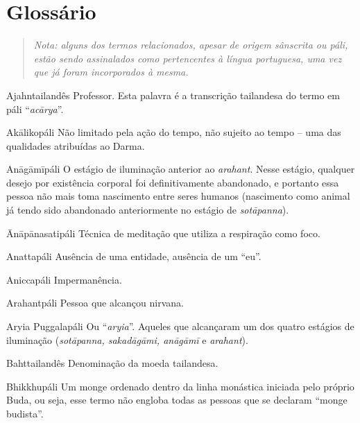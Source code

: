 
\chapter{Glossário}

\begin{quote}
\itshape Nota: alguns dos termos relacionados, apesar de origem sânscrita ou páli, estão sendo assinalados como pertencentes à língua portuguesa, uma vez que já foram incorporados à mesma.
\end{quote}

\begin{glossarydescription}

  \item[{{Ajahn}{tailandês}}] Professor. Esta palavra é a transcrição tailandesa do termo em páli “\emph{acārya}”.

  \item[{{Akāliko}{páli}}] Não limitado pela ação do tempo, não sujeito ao tempo – uma das qualidades atribuídas ao Darma.

  \item[{{Anāgāmī}{páli}}] O estágio de iluminação anterior ao \emph{arahant}. Nesse estágio, qualquer desejo por existência corporal foi definitivamente abandonado, e portanto essa pessoa não mais toma nascimento entre seres humanos (nascimento como animal já tendo sido abandonado anteriormente no estágio de \emph{sotāpanna}).

  \item[{{Ānāpānasati}{páli}}] Técnica de meditação que utiliza a respiração como foco.

  \item[{{Anatta}{páli}}] Ausência de uma entidade, ausência de um “eu”.

  \item[{{Anicca}{páli}}] Impermanência.

  \item[{{Arahant}{páli}}] Pessoa que alcançou nirvana.

  \item[{{Aryia Puggala}{páli}}] Ou “\emph{aryia}”. Aqueles que alcançaram um dos quatro estágios de iluminação (\emph{sotāpanna, sakadāgāmi, anāgāmī} e \emph{arahant}).

  \item[{{Baht}{tailandês}}] Denominação da moeda tailandesa.

  \item[{{Bhikkhu}{páli}}] Um monge ordenado dentro da linha monástica iniciada pelo próprio Buda, ou seja, esse termo não engloba todas as pessoas que se declaram “monge budista”.


\end{glossarydescription}
